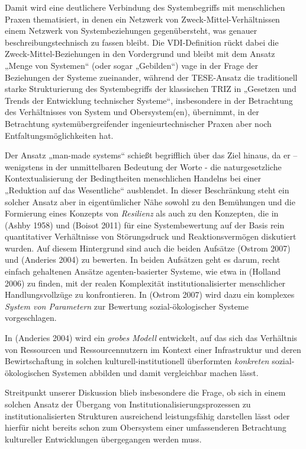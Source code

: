 \documentclass[11pt,a4paper]{article}
\begin{document}
Damit wird eine deutlichere Verbindung des Systembegriffs mit menschlichen
Praxen thematisiert, in denen ein Netzwerk von Zweck-Mittel-Verhältnissen
einem Netzwerk von Systembeziehungen gegenübersteht, was genauer
beschreibungstechnisch zu fassen bleibt. Die VDI-Definition rückt dabei die
Zweck-Mittel-Beziehungen in den Vordergrund und bleibt mit dem Ansatz „Menge
von Systemen“ (oder sogar „Gebilden“) vage in der Frage der Beziehungen der
Systeme zueinander, während der TESE-Ansatz die traditionell starke
Strukturierung des Systembegriffs der klassischen TRIZ in „Gesetzen und Trends
der Entwicklung technischer Systeme“, insbesondere in der Betrachtung des
Verhältnisses von System und Obersystem(en), übernimmt, in der Betrachtung
systemübergreifender ingenieurtechnischer Praxen aber noch
Entfaltungsmöglichkeiten hat.

Der Ansatz „man-made systems“ schießt begriff\-lich über das Ziel hinaus, da
er -- wenigstens in der unmittelbaren Bedeutung der Worte - die
naturgesetzliche Kontextualisierung der Bedingtheiten menschlichen Handelns
bei einer „Reduktion auf das Wesentliche“ ausblendet. In dieser Beschränkung
steht ein solcher Ansatz aber in eigentümlicher Nähe sowohl zu den Bemühungen
und die Formierung eines Konzepts von \emph{Resilienz} als auch zu den
Konzepten, die in (Ashby 1958) und (Boisot 2011) für eine Systembewertung auf
der Basis rein quantitativer Verhältnisse von Störungsdruck und
Reaktionsvermögen diskutiert wurden.  Auf diesem Hintergrund sind auch die
beiden Aufsätze (Ostrom 2007) und (Anderies 2004) zu bewerten. In beiden
Aufsätzen geht es darum, recht einfach gehaltenen Ansätze agenten-basierter
Systeme, wie etwa in (Holland 2006) zu finden, mit der realen Komplexität
institutionalisierter menschlicher Handlungsvollzüge zu konfrontieren.  In
(Ostrom 2007) wird dazu ein komplexes \emph{System von Parametern} zur
Bewertung sozial-ökologischer Systeme vorgeschlagen.

In (Anderies 2004) wird ein \emph{grobes Modell} entwickelt, auf das sich das
Verhältnis von Ressourcen und Ressourcennutzern im Kontext einer Infrastruktur
und deren Bewirtschaftung in solchen kulturell-institutionell überformten
\emph{konkreten} sozial-ökologischen Systemen abbilden und damit vergleichbar
machen lässt.

Streitpunkt unserer Diskussion blieb insbesondere die Frage, ob sich in einem
solchen Ansatz der Übergang von Institutionalisierungsprozessen zu
institutionalisierten Strukturen ausreichend leistungsfähig darstellen lässt
oder hierfür nicht bereits schon zum Obersystem einer umfassenderen
Betrachtung kultureller Entwicklungen übergegangen werden muss.
\end{document}
